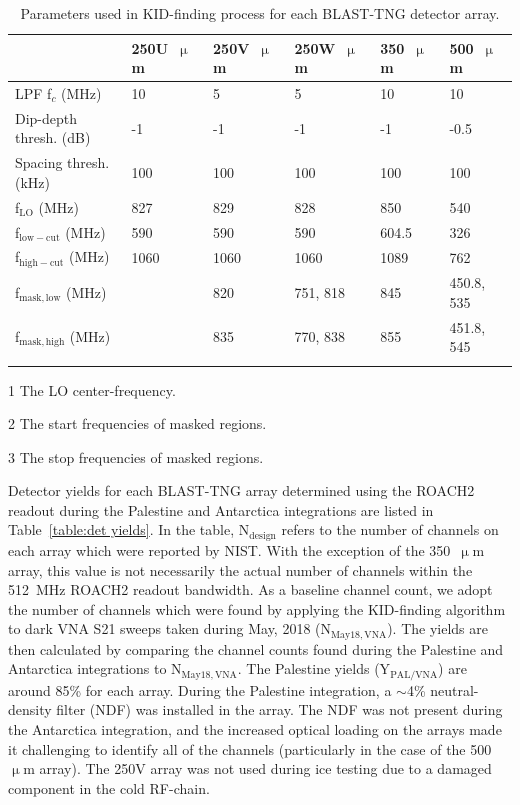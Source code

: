 \begin{table}[!hbtp]
  \centering
  \begin{threeparttable}
    \caption{Parameters used in KID-finding process for each BLAST-TNG detector array.}
\begin{tabular}{@{}llllll@{}}
\dtoprule{}
 & 250U~$\upmu$m & 250V~$\upmu$m & 250W~$\upmu$m & 350~$\upmu$m & 500~$\upmu$m \\ \midrule
LPF f$_{c}$ (MHz) & 10 & 5 & 5 & 10 & 10 \\
Dip-depth thresh. (dB) & -1 & -1 & -1 & -1 & -0.5 \\
Spacing thresh. (kHz) & 100 & 100 & 100 & 100 & 100 \\
f$_\mathrm{LO}$ (MHz)\tnote{1} & 827 & 829 & 828 & 850 & 540 \\
f$_{\mathrm{low-cut}}$ (MHz) & 590 & 590 & 590 & 604.5 & 326 \\
f$_{\mathrm{high-cut}}$ (MHz) & 1060 & 1060 & 1060 & 1089 & 762 \\
f$_{\mathrm{mask,low}}$ (MHz)\tnote{2} &  & 820 & 751, 818 & 845 & 450.8, 535 \\
f$_{\mathrm{mask,high}}$ (MHz)\tnote{3} &  & 835 & 770, 838 & 855 & 451.8, 545 \\ \dbottomrule{}
\\
\end{tabular}
\begin{tablenotes}
\item [1] The LO center-frequency.
\item [2] The start frequencies of masked regions.
\item [3] The stop frequencies of masked regions.
\vspace{2mm}
\end{tablenotes}
\label{table:KID finding params}
\end{threeparttable}
\end{table}

Detector yields for each BLAST-TNG array determined using the ROACH2 readout during the Palestine and Antarctica integrations are listed in Table~\ref{table:det yields}. In the table, N$_{\mathrm{design}}$ refers to the number of channels on each array which were reported by NIST\@. With the exception of the 350~$\upmu$m array, this value is not necessarily the actual number of channels within the 512~MHz ROACH2 readout bandwidth. As a baseline channel count, we adopt the number of channels which were found by applying the KID-finding algorithm to dark VNA \gls{S21} sweeps taken during May, 2018 (N$_{\mathrm{May18,VNA}}$). The yields are then calculated by comparing the channel counts found during the Palestine and Antarctica integrations to N$_{\mathrm{May18,VNA}}$. The Palestine yields (Y$_{\mathrm{PAL/VNA}}$) are around 85\% for each array. During the Palestine integration, a $\sim$4\% neutral-density filter (NDF) was installed in the array. The NDF was not present during the Antarctica integration, and the increased optical loading on the arrays made it challenging to identify all of the channels (particularly in the case of the 500~$\upmu$m array). The 250V array was not used during ice testing due to a damaged component in the cold RF-chain.

